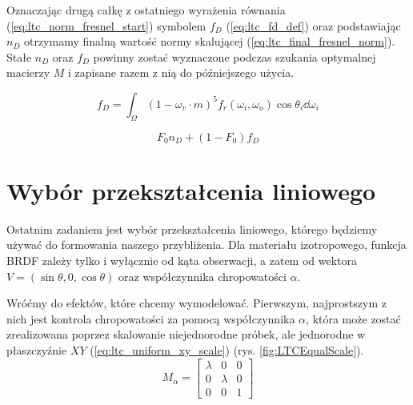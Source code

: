 \documentclass[../main.tex]{subfiles}
\begin{document}
Oznaczając drugą całkę z ostatniego wyrażenia równania (\ref{eq:ltc_norm_fresnel_start}) symbolem $f_D$ (\ref{eq:ltc_fd_def}) oraz podstawiając $n_D$ otrzymamy finalną wartość normy skalującej (\ref{eq:ltc_final_fresnel_norm}). Stałe $n_D$ oraz $f_D$ powinny zostać wyznaczone podczas szukania optymalnej macierzy $M$ i zapisane razem z nią do późniejszego użycia.

\begin{equation}
f_D = \int_{\Omega} {
    (1 - \omega_v \cdot m)^5
    f_r(\omega_i, \omega_o) 
    \cos\theta_i 
    \dd \omega_i
}
\label{eq:ltc_fd_def}
\end{equation}

\begin{equation}
    F_0 n_D + (1-F_0) f_D 
\label{eq:ltc_final_fresnel_norm}
\end{equation}

\section{Wybór przekształcenia liniowego}

Ostatnim zadaniem jest wybór przekształcenia liniowego, którego będziemy używać do formowania naszego przybliżenia. Dla materiału izotropowego, funkcja BRDF zależy tylko i wyłącznie od kąta obserwacji, a zatem od wektora $V = (\sin\theta, 0, \cos\theta)$ oraz współczynnika chropowatości $\alpha$.

Wróćmy do efektów, które chcemy wymodelować. Pierwszym, najprostszym z nich jest kontrola chropowatości za pomocą współczynnika $\alpha$, która może zostać zrealizowana poprzez skalowanie niejednorodne próbek, ale jednorodne w płaszczyźnie $XY$ (\ref{eq:ltc_uniform_xy_scale}) (rys. \ref{fig:LTCEqualScale}).
\begin{equation}
M_{\alpha} =
\begin{bmatrix}
  \lambda & 0 & 0 \\
  0 & \lambda & 0 \\
  0 & 0 & 1
\end{bmatrix}
\label{eq:ltc_uniform_xy_scale}
\end{equation}
\end{document}
